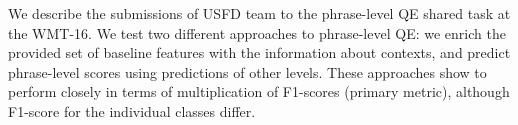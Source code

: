 We describe the submissions of USFD team to the phrase-level QE shared task at the WMT-16. We test two different approaches to phrase-level QE: we enrich the provided set of baseline features with the information about contexts, and predict phrase-level scores using predictions of other levels. These approaches show to perform closely in terms of multiplication of F1-scores (primary metric), although F1-score for the individual classes differ.
